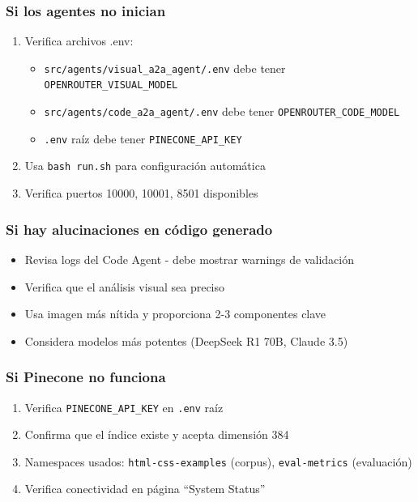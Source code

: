 \documentclass[12pt,a4paper]{article}
\begin{document}
\subsubsection{Si los agentes no inician}

\begin{enumerate}
    \item Verifica archivos .env:
    \begin{itemize}
        \item \texttt{src/agents/visual\_a2a\_agent/.env} debe tener \texttt{OPENROUTER\_VISUAL\_MODEL}
        \item \texttt{src/agents/code\_a2a\_agent/.env} debe tener \texttt{OPENROUTER\_CODE\_MODEL}
        \item \texttt{.env} raíz debe tener \texttt{PINECONE\_API\_KEY}
    \end{itemize}
    \item Usa \texttt{bash run.sh} para configuración automática
    \item Verifica puertos 10000, 10001, 8501 disponibles
\end{enumerate}

\subsubsection{Si hay alucinaciones en código generado}

\begin{itemize}
    \item Revisa logs del Code Agent - debe mostrar warnings de validación
    \item Verifica que el análisis visual sea preciso
    \item Usa imagen más nítida y proporciona 2-3 componentes clave
    \item Considera modelos más potentes (DeepSeek R1 70B, Claude 3.5)
\end{itemize}

\subsubsection{Si Pinecone no funciona}

\begin{enumerate}
    \item Verifica \texttt{PINECONE\_API\_KEY} en \texttt{.env} raíz
    \item Confirma que el índice existe y acepta dimensión 384
    \item Namespaces usados: \texttt{html-css-examples} (corpus), \texttt{eval-metrics} (evaluación)
    \item Verifica conectividad en página ``System Status''
\end{enumerate}
\end{document}
